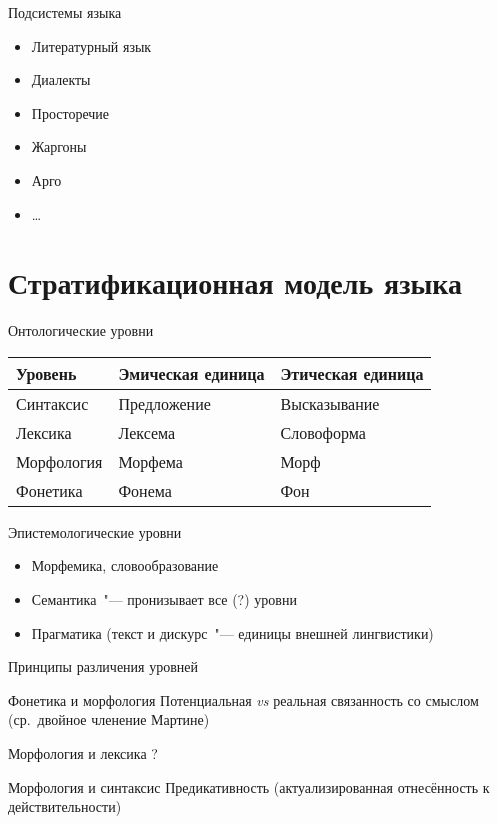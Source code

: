 \begin{frame}{Подсистемы языка}
    \begin{itemize}
        \item Литературный язык
        \item Диалекты
        \item Просторечие
        \item Жаргоны
        \item Арго
        \item \ldots
    \end{itemize}
\end{frame}

\section{Стратификационная модель языка}

\frame{\tableofcontents[currentsection]}

\begin{frame}{Онтологические уровни}
    \begin{table}[t]
        \begin{tabularx}{\textwidth}{XXX}
            Уровень & Эмическая единица & Этическая единица \\ \midrule \midrule
            Синтаксис & Предложение & Высказывание \\ \midrule
            Лексика & Лексема & Словоформа \\ \midrule
            Морфология & Морфема & Морф \\ \midrule
            Фонетика & Фонема & Фон \\
        \end{tabularx}
    \end{table}
\end{frame}

\begin{frame}{Эпистемологические уровни}
    \begin{itemize}
        \item Морфемика, словообразование
        \item Семантика~"--- пронизывает все (?) уровни
        \item Прагматика (текст и дискурс~"--- единицы внешней лингвистики)
    \end{itemize}
\end{frame}

\begin{frame}{Принципы различения уровней}
    \begin{block}{Фонетика и морфология}
        Потенциальная \textit{vs} реальная связанность со смыслом (ср.\ двойное членение Мартине)
    \end{block}

    \begin{block}{Морфология и лексика}
        ?
    \end{block}

    \begin{block}{Морфология и синтаксис}
        Предикативность (актуализированная отнесённость к действительности)
    \end{block}
\end{frame}

